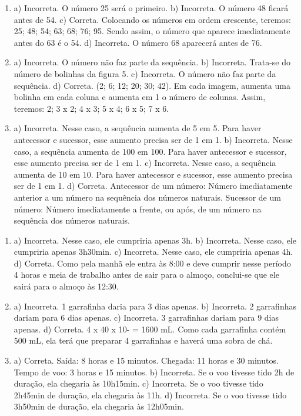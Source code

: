 
\begin{enumerate}
\item
a) Incorreta. O número 25 será o primeiro.
b) Incorreta. O número 48 ficará antes de 54.
c) Correta. Colocando os números em ordem crescente, teremos: 25; 48; 54; 63; 68; 76; 95. Sendo assim, o número que aparece imediatamente antes do 63 é o 54.
d) Incorreta. O número 68 aparecerá antes de 76.

\item
a) Incorreta. O número não faz parte da sequência.
b) Incorreta. Trata-se do número de bolinhas da figura 5.
c) Incorreta. O número não faz parte da sequência.
d) Correta. (2; 6; 12; 20; 30; 42). Em cada imagem, aumenta uma bolinha em cada coluna e aumenta em 1 o número de colunas. Assim, teremos: 2; 3 x 2; 4 x 3; 5 x 4; 6 x 5; 7 x 6.

\item
a) Incorreta. Nesse caso, a sequência aumenta de 5 em 5. Para haver antecessor e sucessor, esse aumento precisa ser de 1 em 1.
b) Incorreta. Nesse caso, a sequência aumenta de 100 em 100. Para haver antecessor e sucessor, esse aumento precisa ser de 1 em 1.
c) Incorreta. Nesse caso, a sequência aumenta de 10 em 10. Para haver antecessor e sucessor, esse aumento precisa ser de 1 em 1.
d) Correta. Antecessor de um número: Número imediatamente anterior a um número na sequência dos números naturais. Sucessor de um número: Número imediatamente a frente, ou após, de um número na sequência dos números naturais.
\end{enumerate}



\begin{enumerate}
\item
a) Incorreta. Nesse caso, ele cumpriria apenas 3h.
b) Incorreta. Nesse caso, ele cumpriria apenas 3h30min.
c) Incorreta. Nesse caso, ele cumpriria apenas 4h.
d) Correta. Como pela manhã ele entra às 8:00 e deve cumprir nesse período 4 horas e
meia de trabalho antes de sair para o almoço, conclui-se que ele sairá para o almoço às 12:30.

\item
a) Incorreta. 1 garrafinha daria para 3 dias apenas.
b) Incorreta. 2 garrafinhas dariam para 6 dias apenas.
c) Incorreta. 3 garrafinhas dariam para 9 dias apenas.
d) Correta. 4 x 40 x 10- = 1600 mL. Como cada garrafinha contém 500 mL, ela terá que
preparar 4 garrafinhas e haverá uma sobra de chá.

\item
a) Correta. Saída: 8 horas e 15 minutos. Chegada: 11 horas e 30 minutos. Tempo de voo: 3 horas e 15 minutos.
b) Incorreta. Se o voo tivesse tido 2h de duração, ela chegaria às 10h15min.
c) Incorreta. Se o voo tivesse tido 2h45min de duração, ela chegaria às 11h.
d) Incorreta. Se o voo tivesse tido 3h50min de duração, ela chegaria às 12h05min.
\end{enumerate}

